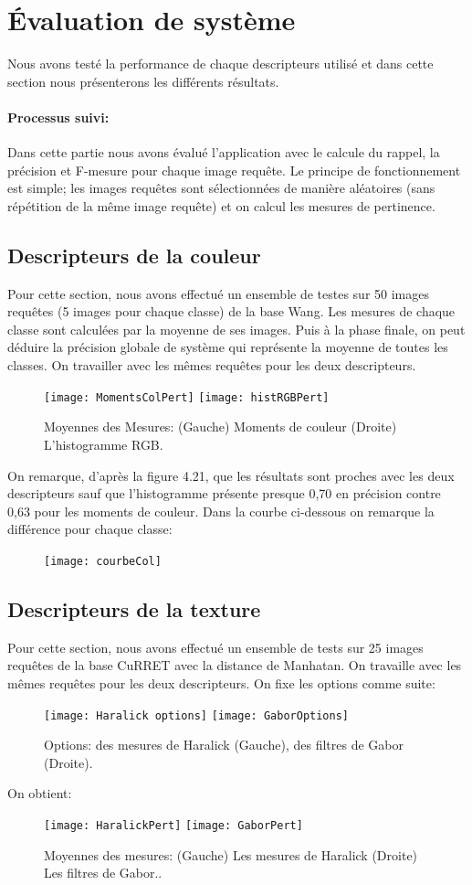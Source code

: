 \section{Évaluation de système}
Nous avons testé la performance de chaque descripteurs utilisé et dans cette section nous présenterons les différents résultats.

\paragraph{Processus suivi:}
Dans cette partie nous avons évalué l’application avec le calcule du rappel, la précision et F-mesure pour chaque image requête. Le principe de fonctionnement est simple; les images requêtes sont sélectionnées de manière aléatoires (sans répétition de la même image requête) et on calcul les mesures de pertinence. 
\subsection{Descripteurs de la couleur}
Pour cette section, nous avons effectué un ensemble de testes sur 50 images requêtes (5 images pour chaque classe) de la base Wang. Les mesures de chaque classe sont calculées par la moyenne de ses images. Puis à la phase finale, on peut déduire la précision globale de système qui représente la moyenne de toutes les classes. On travailler avec les mêmes requêtes pour les deux descripteurs.

\begin{figure}[H]
	\centering
	\texttt{[image: MomentsColPert]} \space \space
	\texttt{[image: histRGBPert]}  
	\caption{Moyennes des Mesures: (Gauche) Moments de couleur (Droite) L'histogramme RGB.}
\end{figure}

On remarque, d'après la figure 4.21, que les résultats sont proches avec les deux descripteurs sauf que l'histogramme présente presque 0,70 en précision contre 0,63 pour les moments de couleur. Dans la courbe ci-dessous on remarque la différence pour chaque classe:
\begin{figure}[H]
	\centering
	\texttt{[image: courbeCol]}
\end{figure}
\subsection{Descripteurs de la texture}
Pour cette section, nous avons effectué un ensemble de tests sur 25 images requêtes de la base CuRRET avec la distance de Manhatan. On travaille avec les mêmes requêtes pour les deux descripteurs. 
On fixe les options comme suite:
\begin{figure}[H]
	\centering
	\texttt{[image: Haralick options]} \space
	\texttt{[image: GaborOptions]} 
	\caption{Options: des mesures de Haralick (Gauche),  des filtres de Gabor (Droite).}
\end{figure}
On obtient:
\begin{figure}[H]
	\centering
	\texttt{[image: HaralickPert]} \space \space
	\texttt{[image: GaborPert]} 
	\caption{Moyennes des mesures: (Gauche) Les mesures de Haralick (Droite) Les filtres de Gabor..}
\end{figure}


